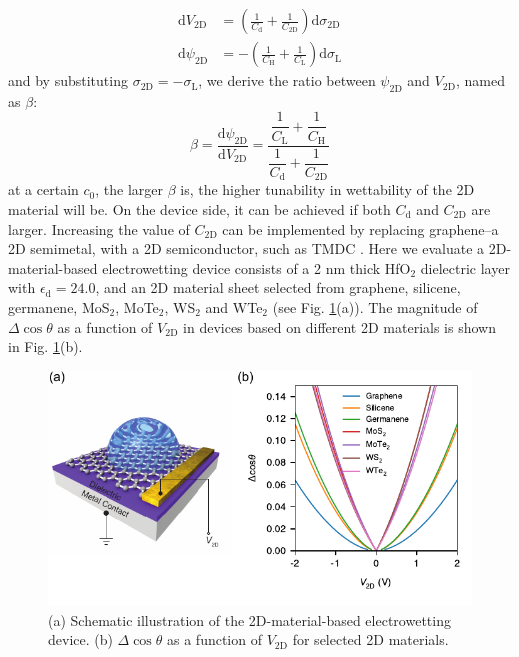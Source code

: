 \documentclass[aps,prl,reprint,groupedaddress,amsmath,amssymb, showpacs]{revtex4-1}
\begin{document}
\begin{align}
\label{eqn:dV-sigma-2D}
\mathrm{d} V_{\mathrm{2D}} &= \left(\frac{1}{C_{\mathrm{d}}} +
\frac{1}{C_{\mathrm{2D}}}\right) \mathrm{d}\sigma_{\mathrm{2D}} \\
\label{eqn:dpsi-sigma-L}
\mathrm{d} \psi_{\mathrm{2D}} &= -\left( \frac{1}{C_{\mathrm{H}}}
+ \frac{1}{C_{\mathrm{L}}} \right) \mathrm{d}\sigma_{\mathrm{L}}
\end{align}
and by substituting \(\sigma_{\mathrm{2D}} = -\sigma_{\mathrm{L}}\), we derive the ratio between \(\psi_{\mathrm{2D}}\) and \(V_{\mathrm{2D}}\), named as \(\beta\):
\begin{equation}
\label{eqn:beta}
\beta = \frac{\mathrm{d} \psi_{\mathrm{2D}}}{\mathrm{d}
V_{\mathrm{2D}}} = \dfrac{\dfrac{1}{C_{\mathrm{L}}} +
\dfrac{1}{C_{\mathrm{H}}}}{\dfrac{1}{C_{\mathrm{d}}} + \dfrac{1}{C_{\mathrm{2D}}}}
\end{equation}
at a certain \(c_{0}\), the larger \(\beta\) is, the higher tunability in
wettability of the 2D material will be. On the device side, it can be
achieved if both \(C_{\mathrm{d}}\) and \(C_{\mathrm{2D}}\) are
larger. Increasing the value of \(C_{\mathrm{2D}}\) can be implemented
by replacing graphene--a 2D semimetal, with a 2D semiconductor, such
as TMDC \cite{tian_multiscale_2016}. Here we evaluate a
2D-material-based electrowetting device consists of a 2 nm thick HfO\(_{\text{2}}\)
dielectric layer with \(\epsilon_{\mathrm{d}}=24.0\), and an 2D material
sheet selected from graphene, silicene, germanene, MoS\(_{\text{2}}\), MoTe\(_{\text{2}}\), WS\(_{\text{2}}\)
and WTe\(_{\text{2}}\) (see Fig. \ref{fig:dcos-all-2D}(a)). The magnitude of \(\Delta
\cos \theta\) as a function of \(V_{\mathrm{2D}}\) in devices based on
different 2D materials is shown in Fig. \ref{fig:dcos-all-2D}(b).
\begin{figure}[htbp]
\centering
\includegraphics[width=0.95\linewidth]{../img/dcos-all-2D.pdf}
\caption{\label{fig:dcos-all-2D}
(a) Schematic illustration of the 2D-material-based electrowetting device. (b) \(\Delta\cos\theta\) as a function of \(V_{\mathrm{2D}}\) for selected 2D materials.}
\end{figure}
\end{document}
